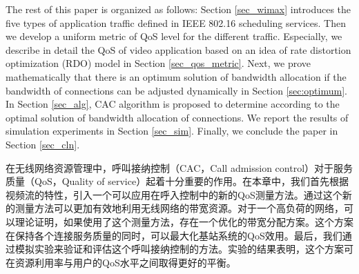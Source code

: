 %
The rest of this paper is organized as follows: Section \ref{sec_wimax} introduces the five types of application traffic defined in IEEE 802.16 scheduling services. 
Then we develop a uniform metric of QoS level for the different traffic. 
Especially, we describe in detail the QoS of video application based on an idea of rate distortion optimization (RDO) model in Section \ref{sec_qos_metric}. 
Next, we prove mathematically that there is an optimum solution of bandwidth allocation if the bandwidth of connections can be adjusted dynamically in Section \ref{sec:optimum}. 
In Section \ref{sec_alg}, CAC algorithm is proposed to determine according to the optimal solution of bandwidth allocation of connections. 
We report the results of simulation experiments in Section \ref{sec_sim}. Finally, we conclude the paper in Section \ref{sec_cln}.

































































\iffalse
在无线网络资源管理中，呼叫接纳控制（CAC，Call admission control）对于服务质量（QoS，Quality of service）起着十分重要的作用。在本章中，我们首先根据视频流的特性，引入一个可以应用在呼入控制中的新的QoS测量方法。通过这个新的测量方法可以更加有效地利用无线网络的带宽资源。对于一个高负荷的网络，可以理论证明，如果使用了这个测量方法，存在一个优化的带宽分配方案。这个方案在保持各个连接服务质量的同时，可以最大化基站系统的QoS效用。最后，我们通过模拟实验来验证和评估这个呼叫接纳控制的方法。实验的结果表明，这个方案可在资源利用率与用户的QoS水平之间取得更好的平衡。

